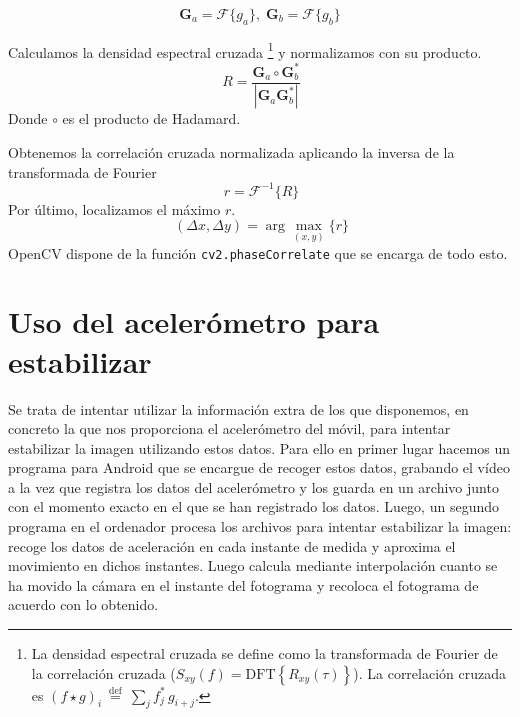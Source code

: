 \documentclass[a4paper,openright, 12pt]{book}
\begin{document}
\begin{equation*} 
    \mathbf{G}_a = \mathcal{F}\{g_a\}, \; \mathbf{G}_b = \mathcal{F}\{g_b\}
\end{equation*}

Calculamos la densidad espectral cruzada \footnote{La densidad espectral cruzada se define como la transformada de Fourier de la correlación cruzada ($ 
    S_{xy}(f)=\mbox{DFT}\left\{R_{xy}(\tau)\right\} $).
La correlación cruzada es 
    $(f\star g)_i \ \stackrel{\mathrm{def}}{=}\ \sum_j f^*_j\,g_{i+j}$.    
     } y normalizamos con su producto.
\begin{equation*}
   \ R = \frac{ \mathbf{G}_a \circ \mathbf{G}_b^*}{|\mathbf{G}_a \mathbf{G}_b^*|}
\end{equation*}
Donde $\circ$ es el producto de Hadamard.

Obtenemos la correlación cruzada normalizada aplicando la inversa de la transformada de Fourier
\begin{equation*}
    \ r = \mathcal{F}^{-1}\{R\}
\end{equation*}
Por último, localizamos el máximo  $r$.
\begin{equation*}
    \ (\Delta x, \Delta y) = \arg \max_{(x, y)}\{r\} 
\end{equation*}
OpenCV dispone de la función \lstinline|cv2.phaseCorrelate| que se encarga de todo esto.
\newpage
\section{Uso del acelerómetro para estabilizar}
Se trata de intentar utilizar la información extra de los que disponemos, en concreto la que nos proporciona el acelerómetro del móvil, para intentar estabilizar la imagen utilizando estos datos.
Para ello en primer lugar hacemos un programa para Android que se encargue de recoger estos datos, grabando el vídeo a la vez que registra los datos del acelerómetro y los guarda en un archivo junto con el momento exacto en el que se han registrado los datos.
Luego, un segundo programa en el ordenador procesa los archivos para intentar estabilizar la imagen: recoge los datos de aceleración en cada instante de medida y aproxima el movimiento en dichos instantes. Luego calcula mediante interpolación cuanto se ha movido la cámara en el instante del fotograma y recoloca el fotograma de acuerdo con lo obtenido.
\end{document}
